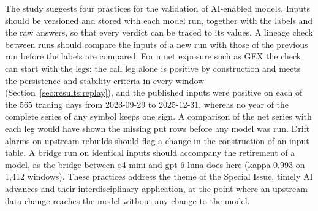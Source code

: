 The study suggests four practices for the validation of AI-enabled models. Inputs should be versioned and stored with each model run, together with the labels and the raw answers, so that every verdict can be traced to its values. A lineage check between runs should compare the inputs of a new run with those of the previous run before the labels are compared. For a net exposure such as GEX the check can start with the legs: the call leg alone is positive by construction and meets the persistence and stability criteria in every window (Section~\ref{sec:results:replay}), and the published inputs were positive on each of the 565 trading days from 2023-09-29 to 2025-12-31, whereas no year of the complete series of any symbol keeps one sign. A comparison of the net series with each leg would have shown the missing put rows before any model was run. Drift alarms on upstream rebuilds should flag a change in the construction of an input table. A bridge run on identical inputs should accompany the retirement of a model, as the bridge between o4-mini and gpt-6-luna does here (kappa 0.993 on 1{,}412 windows). These practices address the theme of the Special Issue, timely AI advances and their interdisciplinary application, at the point where an upstream data change reaches the model without any change to the model.
